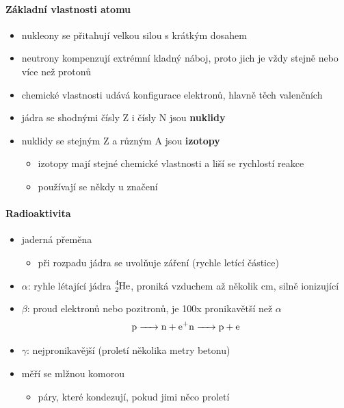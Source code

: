 \documentclass[DIV=8]{scrreprt}
\begin{document}
\paragraph{Základní vlastnosti atomu}
\begin{itemize}[nosep]
    \item nukleony se přitahují velkou silou s krátkým dosahem
    \item neutrony kompenzují extrémní kladný náboj, proto jich je vždy stejně nebo více než protonů
    \item chemické vlastnosti udává konfigurace elektronů, hlavně těch valenčních
    \item jádra se shodnými čísly Z i čísly N jsou \textbf{nuklidy}
    \item nuklidy se stejným Z a různým A jsou \textbf{izotopy}
\begin{itemize}[nosep]
    \item izotopy mají stejné chemické vlastnosti a liší se rychlostí reakce
    \item používají se někdy u značení
\end{itemize}

\end{itemize}



\paragraph{Radioaktivita}
\begin{itemize}[nosep]
    \item jaderná přeměna
\begin{itemize}[nosep]
    \item při rozpadu jádra se uvolňuje záření (rychle letící částice)
\end{itemize}

    \item \(\alpha\): ryhle létající jádra \(\ce{^4_2He}\), proniká vzduchem až několik cm, silně ionizující
    \item \(\beta\): proud elektronů nebo pozitronů, je 100x pronikavětší než \(\alpha\)
\[\ce{p -> n + e+ \\ n -> p + e}\]
    \item \(\gamma\): nejpronikavější (proletí několika metry betonu)
    \item měří se mlžnou komorou
\begin{itemize}[nosep]
    \item páry, které kondezují, pokud jimi něco proletí
\end{itemize}

\end{itemize}
\end{document}
